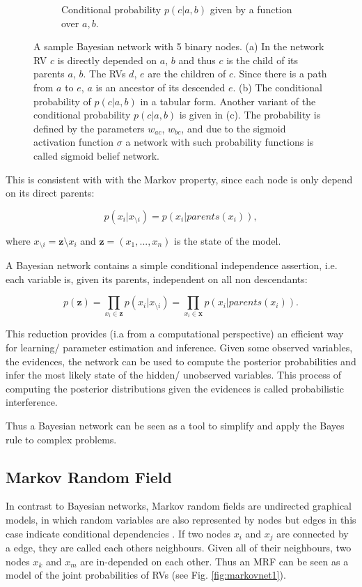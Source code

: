 \begin{figure}[h]
\begin{subfigure}[t]{.33\textwidth}
  		\caption{Conditional probability $p(c |a , b)$ given by a function over $a,b$.}
  		\label{fig:bayesnet}
	\end{subfigure}
	\caption{A sample Bayesian network with 5 binary nodes. (a) In the network RV $c$ is directly depended on $a$, $b$ and thus $c$ is the child of its parents $a$, $b$. The RVs $d$, $e$ are the children of $c$. Since there is a path from $a$ to $e$, $a$ is an ancestor of its descended $e$. (b) The conditional probability of $p(c |a , b)$ in a tabular form. Another variant of the conditional probability $p(c |a , b)$ is given in (c). The probability is defined by the parameters $w_{ac}$, $w_{bc}$, and due to the sigmoid activation function $\sigma$ a network with such probability functions is called sigmoid belief network.}
	\label{fig:test}
\end{figure}

This is consistent with with the Markov property, since each node is only depend on its direct parents:

\[
p(x_i | x_{\setminus i}) = p(x_i | parents(x_i) ),
\]

where $x_{\setminus i} = \textbf{z} \setminus x_i$ and $\textbf{z} = (x_1, ... , x_n)$ is the state of the model.


A Bayesian network contains a simple conditional independence assertion, i.e. each variable is, given its parents, independent on all non descendants:

\[
p(\textbf{z}) = \prod_{x_i \in \textbf{z}} p(x_i | x_{\setminus i}) = \prod_{x_i \in \textbf{x}} p(x_i | parents(x_i) ) .
\]

This reduction provides (i.a from a computational perspective) an efficient way for learning/ parameter estimation and inference.
Given some observed variables, the evidences, the network can be used to compute the posterior probabilities and infer the most likely state of the hidden/ unobserved variables.
This process of computing the posterior distributions given the evidences is called probabilistic interference.

Thus a Bayesian network can be seen as a tool to simplify and apply the Bayes rule to complex problems.   

\subsection{Markov Random Field}

In contrast to Bayesian networks, Markov random fields are undirected graphical models, in which random variables are also represented by nodes but edges in this case indicate conditional dependencies \cite{Goodfellow-et-al-2016-Book}\cite{murphy2012machine}.
If two nodes $x_i$ and $x_j$ are connected by a edge, they are called each others neighbours.
Given all of their neighbours, two nodes $x_k$ and $x_m$ are in-depended on each other.
Thus an MRF can be seen as a model of the joint probabilities of RVs (see Fig. \ref{fig:markovnet1}).

